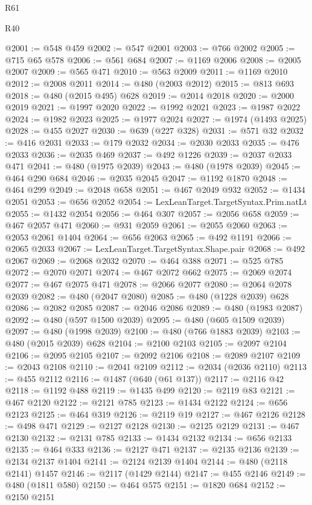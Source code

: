 \begin{lexlean}{R61}
\begin{lexlean}{R40}
\begin{coremodule}
{{{{{{{{{{{{{{{{{{{{{{{{{{{{{{{{{{{{{{{{{{{{{{{{{{{{{{{{{{{{{{{{{{{{{{{{{{{{{{{{{{{{{{{{{{{{{{{{{{{{{{{{{{{{{@2001 := @548 @459
@2002 := @547 @2001
@2003 := @766 @2002
@2005 := @715 @65 @578
@2006 := @561 @684
@2007 := @1169 @2006
@2008 := @2005 @2007
@2009 := @565 @471
@2010 := @563 @2009
@2011 := @1169 @2010
@2012 := @2008 @2011
@2014 := @480 (@2003 @2012)
@2015 := @813 @693
@2018 := @480 (@2015 @495) @628
@2019 := @2014 @2018
@2020 := @2000 @2019
@2021 := @1997 @2020
@2022 := @1992 @2021
@2023 := @1987 @2022
@2024 := @1982 @2023
@2025 := @1977 @2024
@2027 := @1974 (@1493 @2025)
@2028 := @455 @2027
@2030 := @639 (@227 @328)
@2031 := @571 @32
@2032 := @416 @2031
@2033 := @179 @2032
@2034 := @2030 @2033
@2035 := @476 @2033
@2036 := @2035 @469
@2037 := @492 @1226
@2039 := @2037 @2033 @471
@2041 := @480 (@1975 @2039)
@2043 := @480 (@1978 @2039)
@2045 := @464 @290 @684
@2046 := @2035 @2045
@2047 := @1192 @1870
@2048 := @464 @299
@2049 := @2048 @658
@2051 := @467 @2049 @932
@2052 := @1434 @2051
@2053 := @656 @2052
@2054 := LexLeanTarget.TargetSyntax.Prim.natLt
@2055 := @1432 @2054
@2056 := @464 @307
@2057 := @2056 @658
@2059 := @467 @2057 @471
@2060 := @931 @2059
@2061 := @2055 @2060
@2063 := @2053 @2061 @1404
@2064 := @656 @2063
@2065 := @492 @1191
@2066 := @2065 @2033
@2067 := LexLeanTarget.TargetSyntax.Shape.pair
@2068 := @492 @2067
@2069 := @2068 @2032
@2070 := @464 @388
@2071 := @525 @785
@2072 := @2070 @2071
@2074 := @467 @2072 @662
@2075 := @2069 @2074
@2077 := @467 @2075 @471
@2078 := @2066 @2077
@2080 := @2064 @2078 @2039
@2082 := @480 (@2047 @2080)
@2085 := @480 (@1228 @2039) @628
@2086 := @2082 @2085
@2087 := @2046 @2086
@2089 := @480 (@1983 @2087)
@2092 := @480 (@597 @1500 @2039)
@2095 := @480 (@605 @1509 @2039)
@2097 := @480 (@1998 @2039)
@2100 := @480 (@766 @1883 @2039)
@2103 := @480 (@2015 @2039) @628
@2104 := @2100 @2103
@2105 := @2097 @2104
@2106 := @2095 @2105
@2107 := @2092 @2106
@2108 := @2089 @2107
@2109 := @2043 @2108
@2110 := @2041 @2109
@2112 := @2034 (@2036 @2110)
@2113 := @455 @2112
@2116 := @1487 (@640 (@61 @137))
@2117 := @2116 @42
@2118 := @1192 @488
@2119 := @1435 @499
@2120 := @2119 @83
@2121 := @467 @2120
@2122 := @2121 @785
@2123 := @1434 @2122
@2124 := @656 @2123
@2125 := @464 @319
@2126 := @2119 @19
@2127 := @467 @2126
@2128 := @498 @471
@2129 := @2127 @2128
@2130 := @2125 @2129
@2131 := @467 @2130
@2132 := @2131 @785
@2133 := @1434 @2132
@2134 := @656 @2133
@2135 := @464 @333
@2136 := @2127 @471
@2137 := @2135 @2136
@2139 := @2134 @2137 @1404
@2141 := @2124 @2139 @1404
@2144 := @480 (@2118 @2141) @1457
@2146 := @2117 (@1429 @2144)
@2147 := @455 @2146
@2149 := @480 (@1811 @580)
@2150 := @464 @575
@2151 := @1820 @684
@2152 := @2150 @2151
}}}}}}}}}}}}}}}}}}}}}}}}}}}}}}}}}}}}}}}}}}}}}}}}}}}}}}}}}}}}}}}}}}}}}}}}}}}}}}}}}}}}}}}}}}}}}}}}}}}}}}}}}}}}}
\end{coremodule}
\end{lexlean}
\end{lexlean}
